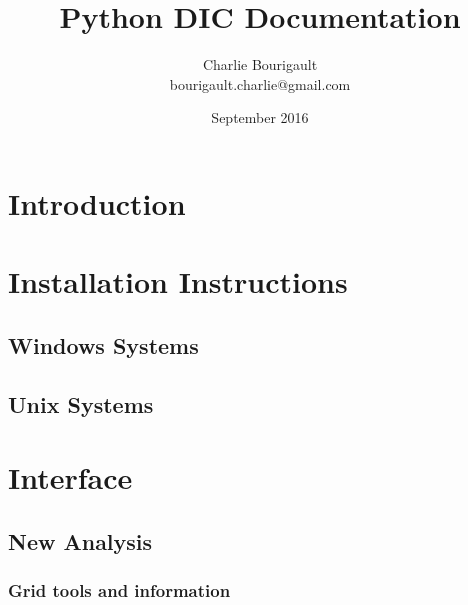 \documentclass{article}
\begin{document}
\title{Python DIC Documentation}
\author{Charlie Bourigault\\ bourigault.charlie@gmail.com}
\date{September 2016}
\maketitle
\thispagestyle{empty}
\begin{abstract}
  
\end{abstract}
\newpage
\tableofcontents


\newpage
\section*{Introduction}
\label{sec:Introduction}
\vspace{.5cm}


\newpage
\section{Installation Instructions}
\label{sec:Installation Instructions}
\vspace{.5cm}


\subsection{Windows Systems}
\label{sub:Windows Systems}
  

\subsection{Unix Systems}
\label{sub:Unix Systems}
  

\newpage
\section{Interface}
\label{sec:Interface}
\vspace{.5cm}
  

  \subsection{New Analysis}
  \label{sub:New Analysis}
    

    \subsubsection{Grid tools and information}
    \label{subs:Grid Tools and Information}
      
\end{document}
